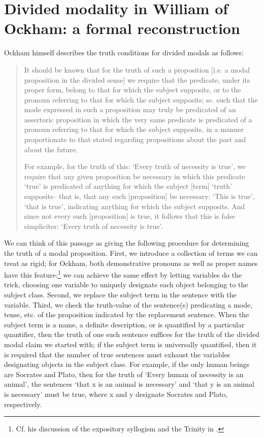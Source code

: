 \documentclass[a4paper]{article}
\begin{document}
\section{Divided modality in William of Ockham: a formal reconstruction}
Ockham himself describes the truth conditions for divided modals as follows:

\begin{quote}
It should be known that for the truth of such a proposition [i.e. a modal proposition in the divided sense] we require that the predicate, under its proper form, belong to that for which the subject supposits, or to the pronoun referring to that for which the subject supposits; sc. such that the mode expressed in such a proposition may truly be predicated of an assertoric proposition in which the very same predicate is predicated of a pronoun referring to that for which the subject supposits, in a manner proportionate to that stated regarding propositions about the past and about the future. 

For example, for the truth of this: `Every truth of necessity is true', we require that any given proposition be necessary in which this predicate `true' is predicated of anything for which the subject [term] `truth' supposits– that is, that any such [proposition] be necessary:  `This is true', `that is true', indicating anything for which the subject supposits. And since not every such [proposition] is true, it follows that this is false simpliciter: `Every truth of necessity is true'. \cite[II. 10, p. 249]{OckhamSL2} 
\end{quote}

We can think of this passage as giving the following procedure for determining the truth of a modal proposition. First, we introduce a collection of terms we can treat as rigid; for Ockham, both demonstrative pronouns as well as proper names have this feature;\footnote{Cf. his discussion of the expository syllogism and the Trinity in \cite[II. 27, p. 306]{OckhamSL2}.} we can achieve the same effect by letting variables do the trick, choosing one variable to uniquely designate each object belonging to the subject class. Second, we replace the subject term in the sentence with the variable. Third, we check the truth-value of the sentence(s) predicating a mode, tense, etc. of the proposition indicated by the replacement sentence. When the subject term is a name, a definite description, or is quantified by a particular quantifier, then the truth of one such sentence suffices for the truth of the divided modal claim we started with; if the subject term is universally quantified, then it is required that the number of true sentences must exhaust the variables designating objects in the subject class. For example, if the only human beings are Socrates and Plato, then for the truth of `Every human of necessity is an animal', the sentences `that x is an animal is necessary' and `that y is an animal is necessary' must be true, where x and y designate Socrates and Plato, respectively.
\end{document}
